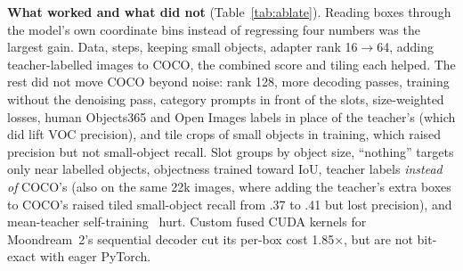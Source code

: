 \documentclass[10pt,twocolumn]{article}
\begin{document}
\textbf{What worked and what did not} (Table~\ref{tab:ablate}). Reading boxes through
the model's own coordinate bins instead of regressing four numbers was the largest gain.
Data, steps, keeping small objects, adapter rank 16$\rightarrow$64, adding
teacher-labelled images to COCO, the combined score and tiling each helped. The rest did
not move COCO beyond noise: rank 128, more decoding passes, training without the
denoising pass, category prompts in front of the slots, size-weighted losses,
human Objects365 and Open Images labels in place of the teacher's (which did lift VOC
precision), and tile crops of small objects in training, which raised precision but not
small-object recall. Slot
groups by object size, ``nothing'' targets only near labelled objects, objectness
trained toward IoU, teacher labels \emph{instead of} COCO's (also on the same 22k
images, where adding the teacher's extra boxes to COCO's raised tiled small-object
recall from .37 to .41 but lost precision), and mean-teacher
self-training~\citep{tarvainen2017meanteacher,liu2021unbiasedteacher,xie2020noisystudent}
hurt. Custom fused CUDA kernels for Moondream~2's sequential decoder cut its per-box cost
1.85$\times$, but are not bit-exact with eager PyTorch.
\end{document}
